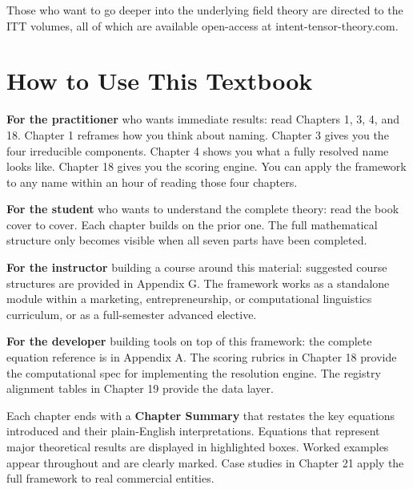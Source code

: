 \documentclass[12pt, openany]{book}
\theoremstyle{thmstyle}
\theoremstyle{defstyle}
\begin{document}
Those who want to go deeper into the underlying field theory are directed to the ITT volumes, all of which are available open-access at intent-tensor-theory.com.

\newpage

\chapter*{How to Use This Textbook}

\textbf{For the practitioner} who wants immediate results: read Chapters 1, 3, 4, and 18. Chapter 1 reframes how you think about naming. Chapter 3 gives you the four irreducible components. Chapter 4 shows you what a fully resolved name looks like. Chapter 18 gives you the scoring engine. You can apply the framework to any name within an hour of reading those four chapters.

\textbf{For the student} who wants to understand the complete theory: read the book cover to cover. Each chapter builds on the prior one. The full mathematical structure only becomes visible when all seven parts have been completed.

\textbf{For the instructor} building a course around this material: suggested course structures are provided in Appendix G. The framework works as a standalone module within a marketing, entrepreneurship, or computational linguistics curriculum, or as a full-semester advanced elective.

\textbf{For the developer} building tools on top of this framework: the complete equation reference is in Appendix A. The scoring rubrics in Chapter 18 provide the computational spec for implementing the resolution engine. The registry alignment tables in Chapter 19 provide the data layer.

\vspace{8pt}

Each chapter ends with a \textbf{Chapter Summary} that restates the key equations introduced and their plain-English interpretations. Equations that represent major theoretical results are displayed in highlighted boxes. Worked examples appear throughout and are clearly marked. Case studies in Chapter 21 apply the full framework to real commercial entities.
\end{document}
